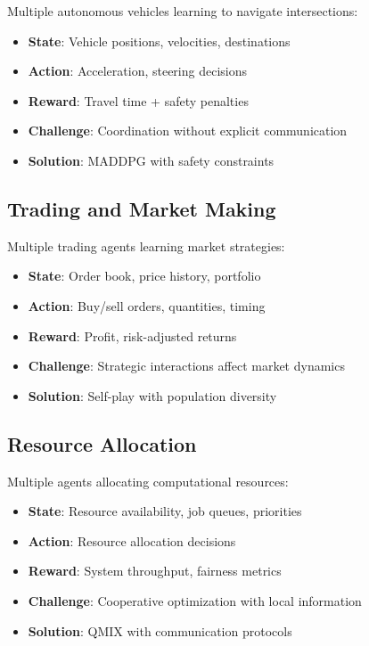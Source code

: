 \begin{examplebox}
Multiple autonomous vehicles learning to navigate intersections:
\begin{itemize}
    \item \textbf{State}: Vehicle positions, velocities, destinations
    \item \textbf{Action}: Acceleration, steering decisions
    \item \textbf{Reward}: Travel time + safety penalties
    \item \textbf{Challenge}: Coordination without explicit communication
    \item \textbf{Solution}: MADDPG with safety constraints
\end{itemize}
\end{examplebox}

\subsection{Trading and Market Making}

\begin{examplebox}
Multiple trading agents learning market strategies:
\begin{itemize}
    \item \textbf{State}: Order book, price history, portfolio
    \item \textbf{Action}: Buy/sell orders, quantities, timing
    \item \textbf{Reward}: Profit, risk-adjusted returns
    \item \textbf{Challenge}: Strategic interactions affect market dynamics
    \item \textbf{Solution}: Self-play with population diversity
\end{itemize}
\end{examplebox}

\subsection{Resource Allocation}

\begin{examplebox}
Multiple agents allocating computational resources:
\begin{itemize}
    \item \textbf{State}: Resource availability, job queues, priorities
    \item \textbf{Action}: Resource allocation decisions
    \item \textbf{Reward}: System throughput, fairness metrics
    \item \textbf{Challenge}: Cooperative optimization with local information
    \item \textbf{Solution}: QMIX with communication protocols
\end{itemize}
\end{examplebox}

